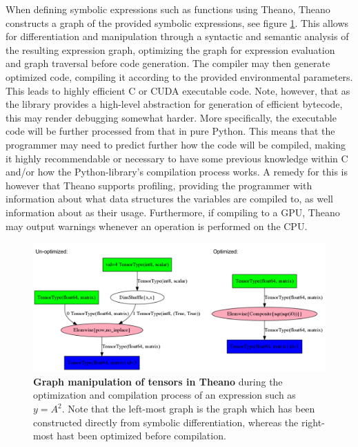 When defining symbolic expressions such as functions using Theano, Theano constructs a graph of the provided symbolic expressions, see figure \ref{fig:theano_graph_demo}. This allows for differentiation and manipulation through a syntactic and semantic analysis of the resulting expression graph, optimizing the graph for expression evaluation and graph traversal before code generation. The compiler may then generate optimized code, compiling it according to the provided environmental parameters. This leads to highly efficient C or CUDA executable code.
Note, however, that as the library provides a high-level abstraction for generation of efficient bytecode, this may render debugging somewhat harder. More specifically, the executable code will be further processed from that in pure Python. This means that the programmer may need to predict further how the code will be compiled, making it highly recommendable or necessary to have some previous knowledge within C and/or how the Python-library's compilation process works. A remedy for this is however that Theano supports profiling, providing the programmer with information about what data structures the variables are compiled to, as well information about as their usage. Furthermore, if compiling to a GPU, Theano may output warnings whenever an operation is performed on the CPU.

\begin{figure}
\centering
\includegraphics[width=12cm]{fig/unopt_opt_theano_graph}
\caption{\textbf{Graph manipulation of tensors in Theano} during the optimization and compilation process of an expression such as $y = A^2$. Note that the left-most graph is the graph which has been constructed directly from symbolic differentiation, whereas the right-most hast been optimized before compilation.}
\label{fig:theano_graph_demo}
\end{figure}

